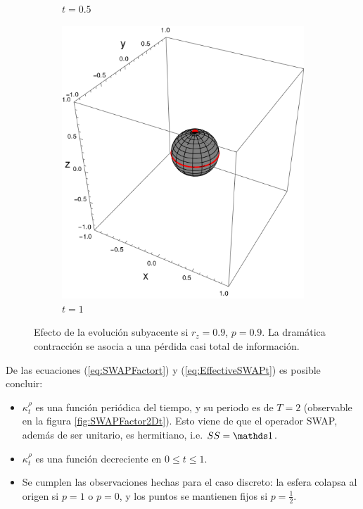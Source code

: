 \begin{figure}[h!]
\begin{subfigure}{0.32\textwidth}
    \caption{$t=0.5$}
  \end{subfigure}
  \begin{subfigure}{0.32\textwidth}
    \centering
    \includegraphics[width=0.9\linewidth]{chapter3/figures_toy/sphere_swapcontraction_t=1.0_z=0.9_p=0.9.png}
    \caption{$t=1$}
  \end{subfigure}
  \caption{Efecto de la evolución subyacente si $r_{z}=0.9$, $p=0.9$. La dramática contracción se asocia a una pérdida casi total de información.}
  \label{fig:SWAPFactorSequence}
  \end{figure}

De las ecuaciones (\ref{eq:SWAPFactort}) y (\ref{eq:EffectiveSWAPt}) es posible concluir:
\begin{itemize}
  \item $\kappa_{t}^{\rho}$ es una función periódica del tiempo, y su periodo es de $T=2$ (observable en la figura \ref{fig:SWAPFactor2Dt}). Esto viene de que el operador SWAP, además de ser unitario, es hermitiano, i.e. $SS=\Id$.
  \item $\kappa_{t}^{\rho}$ es una función decreciente en $0\leq t\leq 1$.
  \item Se cumplen las observaciones hechas para el caso discreto: la esfera colapsa al origen si $p=1$ o $p=0$, y los puntos se mantienen fijos si $p=\frac{1}{2}$.
\end{itemize}

